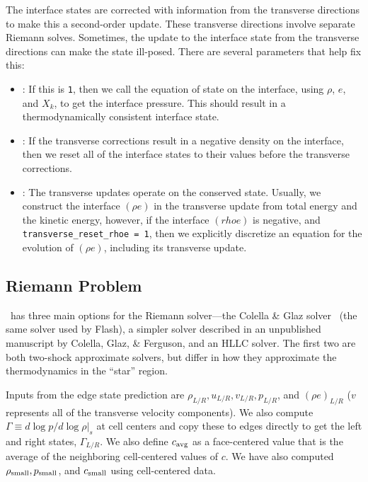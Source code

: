 The interface states are corrected with information from the
transverse directions to make this a second-order update.  These
transverse directions involve separate Riemann solves.  Sometimes, the
update to the interface state from the transverse directions can make
the state ill-posed.  There are several parameters that help fix this:
\begin{itemize}
  \item {}: If this is {\tt 1}, then we call
    the equation of state on the interface, using $\rho$, $e$, and
    $X_k$, to get the interface pressure.  This should result in a
    thermodynamically consistent interface state.

  \item {}: If the transverse
    corrections result in a negative density on the interface, then we
    reset all of the interface states to their values before the
    transverse corrections.

  \item {}: The transverse updates operate
    on the conserved state.  Usually, we construct the interface
    $(\rho e)$ in the transverse update from total energy and the
    kinetic energy, however, if the interface $(rho e)$ is negative,
    and {\tt transverse\_reset\_rhoe = 1}, then we explicitly
    discretize an equation for the evolution of $(\rho e)$, including
    its transverse update.
\end{itemize}





\subsection{Riemann Problem}

\castro\ has three main options for the Riemann solver---the
Colella \& Glaz solver~\cite{colglaz} (the same solver used
by Flash), a simpler solver described in an unpublished
manuscript by Colella, Glaz, \& Ferguson, and an HLLC
solver.  The first two are both
two-shock approximate solvers, but differ in how they approximate
the thermodynamics in the ``star'' region.  

Inputs from the edge state prediction are $\rho_{L/R}, u_{L/R},
v_{L/R}, p_{L/R}$, and $(\rho e)_{L/R}$ ($v$ represents all of the
transverse velocity components).  We also compute $\Gamma \equiv d\log
p / d\log \rho |_s$ at cell centers and copy these to edges directly
to get the left and right states, $\Gamma_{L/R}$.  We also define
$c_{\rm avg}$ as a face-centered value that is the average of the
neighboring cell-centered values of $c$.  We have also computed
$\rho_{\rm small}, p_{\rm small}$, and $c_{\rm small}$ using
cell-centered data.

